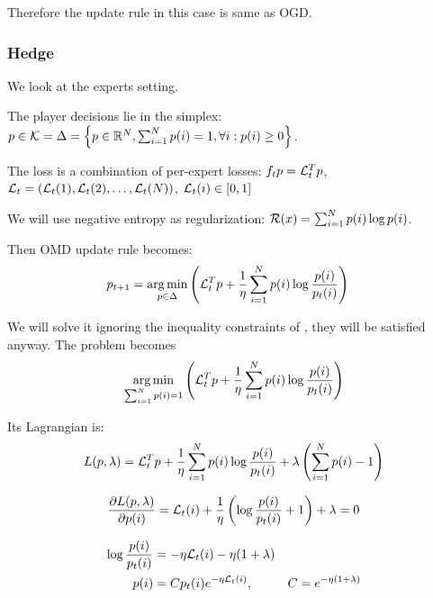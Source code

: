 \documentclass[11pt]{article}
\theoremstyle{definition}
\theoremstyle{definition}
\newcommand{\pth}[1]{\left( #1\right)}                 %
\newcommand{\brk}[1]{\left[ #1\right]}                 %
\newcommand{\braces}[1]{\left\lbrace #1\right\rbrace } %
\newcommand{\Kset}{\ensuremath{\K}}
\begin{document}
Therefore the update rule in this case is same as OGD.


\subsubsection{Hedge}

We look at the experts setting.

The player decisions lie in the simplex: $ p \in \Kset = \simplex = \braces{ p \in \reals^N, \sum_{i=1}^{N} p(i) = 1, \forall i: p(i) \geq 0 } $.

The loss is a combination of per-expert losses: $ f_t{p} = {\mathcal L}_t^T p $, $ \L_t = \pth{ \L_t(1), \L_t(2), \dots , \L_t(N)} $, $ \L_t(i) \in \brk{0, 1}$

We will use negative entropy as regularization: $ \mathcal R(x) = \sum_{i=1}^{N} p(i) \log p(i) $.

Then OMD update rule becomes:
\begin{equation*}
\begin{aligned}
p_{t+1}
&= \argmin_{p \in \simplex} \pth{ \L_t^T p + \frac{1}{\eta} \sum_{i=1}^{N} p(i) \log \frac{p(i)}{p_t(i)} }
\end{aligned}
\end{equation*}

We will solve it ignoring the inequality constraints of \simplex{}, they will be satisfied anyway.
The problem becomes
\begin{equation*}
\argmin_{\sum_{i=1}^{N} p(i) = 1} \pth{ \L_t^T p + \frac{1}{\eta} \sum_{i=1}^{N} p(i) \log \frac{p(i)}{p_t(i)} }
\end{equation*}

Its Lagrangian is:
\begin{equation*}
L(p, \lambda) = \L_t^T p + \frac{1}{\eta} \sum_{i=1}^{N} p(i) \log \frac{p(i)}{p_t(i)} + \lambda \pth{ \sum_{i=1}^{N} p(i) - 1 }
\end{equation*}

\begin{equation*}
\frac{\partial L(p, \lambda) }{\partial p(i)} = \L_t(i) + \frac{1}{\eta} \pth{ \log \frac{p(i)}{p_t(i)} + 1} + \lambda = 0
\end{equation*}

\begin{equation*}
\begin{aligned}
\log \frac{p(i)}{p_t(i)} &= -\eta {\mathcal L}_t(i) - \eta (1 + \lambda)
\\
p(i) &= C p_t(i) e^{-\eta {\mathcal L}_t(i)}, & C = e^{-\eta (1+\lambda)} 
\end{aligned}
\end{equation*}
\end{document}

